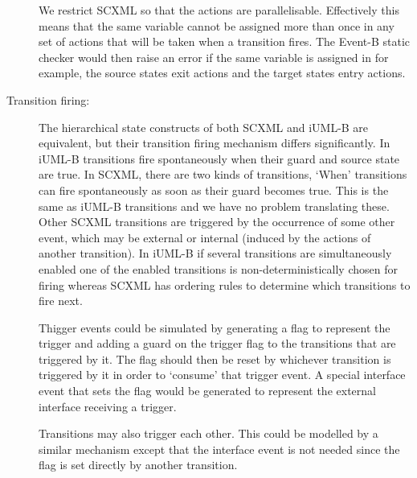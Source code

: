 \begin{description}
We restrict SCXML so that the actions are parallelisable. 
Effectively this means that the same variable cannot be 
assigned more than once in any set of actions that will be 
taken when a transition fires. The Event-B static checker 
would then raise an error if the same variable is assigned 
in for example, the source states exit actions and the 
target states entry actions. 



\item [Transition firing:]
The hierarchical state constructs of both SCXML and
iUML-B are equivalent, but their transition 
firing mechanism differs significantly. In iUML-B 
transitions fire spontaneously when their guard and source 
state are true. In SCXML, there are two kinds of transitions, 
‘When’ transitions can fire spontaneously as soon as their 
guard becomes true. This is the same as iUML-B transitions 
and we have no problem translating these. Other SCXML
transitions are triggered by the 
occurrence of some other event, which may be external 
or internal (induced by the actions of another transition). 
In iUML-B if several transitions are simultaneously 
enabled one of the enabled transitions is non-deterministically 
chosen for firing whereas SCXML has ordering rules to 
determine which transitions to fire next.

Thigger events could be simulated by generating a flag to 
represent the trigger and adding a guard on the trigger 
flag to the transitions that are triggered by it. The flag 
should then be reset by whichever transition is triggered 
by it in order to ‘consume’ that trigger event. A special 
interface event that sets the flag would be generated to 
represent the external interface receiving a trigger.

Transitions may also trigger each other. This could be 
modelled by a similar mechanism except that the interface 
event is not needed since the flag is set directly by 
another transition.


\end{description}
